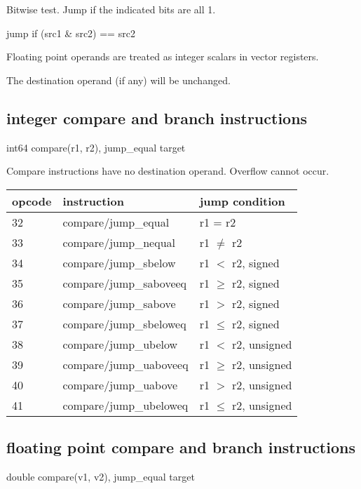 \documentclass[forwardcom.tex]{subfiles}
\begin{document}
Bitwise test. Jump if the indicated bits are all 1.
\vspace{2mm}

jump if (src1 \& src2) == src2
\vspace{2mm}

Floating point operands are treated as integer scalars in vector registers.
\vspace{2mm}

The destination operand (if any) will be unchanged.


\subsection{integer compare and branch instructions}
int64 compare(r1, r2), jump\_equal target
\vspace{2mm}

Compare instructions have no destination operand. 
Overflow cannot occur.
\vspace{2mm}

\label{table:integerCompareJumpInstructions}
\begin{tabular}{|p{12mm}|p{60mm}|p{50mm}|}
\hline
\bfseries opcode & \bfseries instruction & \bfseries jump condition \\ \hline
32 & compare/jump\_equal & r1 = r2 \\ \hline
33 & compare/jump\_nequal  & r1 $\neq$ r2 \\ \hline
34 & compare/jump\_sbelow & r1 $<$ r2, signed \\ \hline
35 & compare/jump\_saboveeq & r1 $\geq$ r2, signed \\ \hline
36 & compare/jump\_sabove & r1 $>$ r2, signed  \\ \hline
37 & compare/jump\_sbeloweq  & r1 $\leq$ r2, signed \\ \hline
38 & compare/jump\_ubelow & r1 $<$ r2, unsigned \\ \hline
39 & compare/jump\_uaboveeq  & r1 $\geq$ r2, unsigned \\ \hline
40 & compare/jump\_uabove & r1 $>$ r2, unsigned \\ \hline
41 & compare/jump\_ubeloweq  & r1 $\leq$ r2, unsigned \\ \hline
\end{tabular}
\vspace{2mm}


\subsection{floating point compare and branch instructions}
double compare(v1, v2), jump\_equal target
\vspace{2mm}
\end{document}
